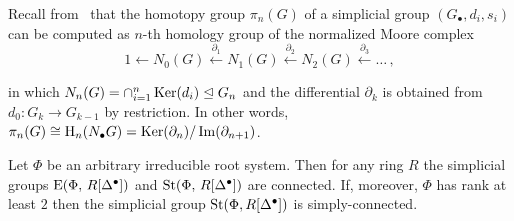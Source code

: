 \documentclass[oneside, 11pt]{amsart} \pdfoutput=1
\begin{document}
Recall from~\cite[\S~17]{May67} that the homotopy group $\pi_n(G)$ of a simplicial group $(G_\bullet, d_i, s_i)$ can be computed as $n$-th homology group of the normalized Moore complex
\[
1 \leftarrow N_0(G) \xleftarrow{\partial_1} N_1(G) \xleftarrow{\partial_2} N_2(G) \xleftarrow{\partial_3} \ldots\,,
\]
\iffalse\[\begin{tikzcd} 1 & N_0(G) \ar[l] & N_1(G) \ar{l}[swap]{\partial_1} & N_2(G) \ar{l}[swap]{\partial_2} & \ar{l}[swap]{\partial_3} \ldots, \end{tikzcd} \] \fi
in which $N_n(G) = \cap_{i=1}^n\mathop{\mathrm{Ker}}\nolimits(d_i) \trianglelefteq G_n$ and the differential $\partial_k$ is obtained from $d_0\colon G_k \to G_{k-1}$ by restriction. In other words, $\pi_n(G) \cong \mathrm{H}_n(N_\bullet G) = \mathop{\mathrm{Ker}}\nolimits(\partial_n) / \mathop{\mathrm{Im}}\nolimits(\partial_{n+1})$.

\begin{prop}\label{prop:pi1-StDelta} Let $\Phi$ be an arbitrary irreducible root system. Then for any ring $R$ the simplicial groups $\mathrm{E}(\Phi,\,R[\Delta^\bullet])$ and $\mathop{\mathrm{St}}\nolimits(\Phi,\,R[\Delta^\bullet])$ are connected. If, moreover, $\Phi$ has rank at least $2$ then the simplicial group $\mathop{\mathrm{St}}\nolimits(\Phi, R[\Delta^\bullet])$ is simply-connected. \end{prop}
\end{document}
